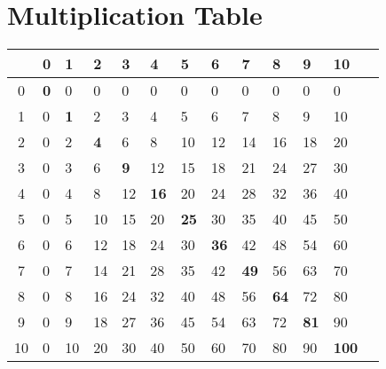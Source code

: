 \section{Multiplication Table}
\begin{table}[h]
\centering
\begin{tabular}{c| llllllllllll}
   & 0          & 1          & 2          & 3          & 4           & 5           & 6           & 7           & 8           & 9           & 10            \\
   \hline
0  & \textbf{0} & 0          & 0          & 0          & 0           & 0           & 0           & 0           & 0           & 0           & 0             \\
1  & 0          & \textbf{1} & 2          & 3          & 4           & 5           & 6           & 7           & 8           & 9           & 10            \\
2  & 0          & 2          & \textbf{4} & 6          & 8           & 10          & 12          & 14          & 16          & 18          & 20            \\
3  & 0          & 3          & 6          & \textbf{9} & 12          & 15          & 18          & 21          & 24          & 27          & 30            \\
4  & 0          & 4          & 8          & 12         & \textbf{16} & 20          & 24          & 28          & 32          & 36          & 40            \\
5  & 0          & 5          & 10         & 15         & 20          & \textbf{25} & 30          & 35          & 40          & 45          & 50            \\
6  & 0          & 6          & 12         & 18         & 24          & 30          & \textbf{36} & 42          & 48          & 54          & 60            \\
7  & 0          & 7          & 14         & 21         & 28          & 35          & 42          & \textbf{49} & 56          & 63          & 70            \\
8  & 0          & 8          & 16         & 24         & 32          & 40          & 48          & 56          & \textbf{64} & 72          & 80            \\
9  & 0          & 9          & 18         & 27         & 36          & 45          & 54          & 63          & 72          & \textbf{81} & 90            \\
10 & 0          & 10         & 20         & 30         & 40          & 50          & 60          & 70          & 80          & 90          & \textbf{100} 
\end{tabular}
\end{table}
